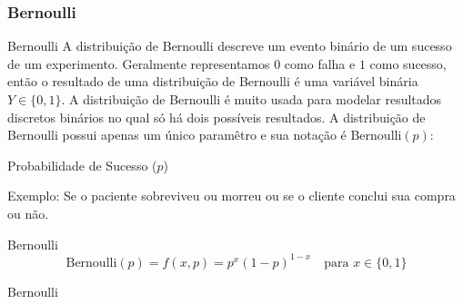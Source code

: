 \subsubsection{Bernoulli}
\begin{frame}{Bernoulli}
    A distribuição de Bernoulli descreve um evento binário de um sucesso de um experimento.
    Geralmente representamos $0$ como falha e $1$ como sucesso, então o resultado de uma distribuição de Bernoulli é
    uma variável binária $Y \in \{0, 1\}$.
    \vfill
    A distribuição de Bernoulli é muito usada para modelar resultados discretos binários no qual só há dois possíveis resultados.
    \vfill
    A distribuição de Bernoulli possui apenas um único paramêtro e sua notação é $\text{Bernoulli} (p)$:
    \begin{vfilleditems}
        \item Probabilidade de Sucesso ($p$)
    \end{vfilleditems}
    \vfill
    Exemplo: Se o paciente sobreviveu ou morreu ou se o cliente conclui sua compra ou não.
\end{frame}

\begin{frame}{Bernoulli}
    $$\text{Bernoulli}(p) = f(x, p)=p^{x}(1-p)^{1-x} \quad \text{para $x \in \{0,1\}$}$$ %
\end{frame}

\begin{frame}{Bernoulli}
  \centering
\end{frame}

